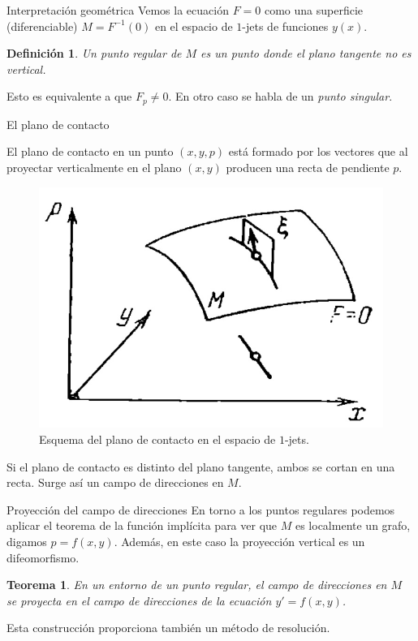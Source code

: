 \documentclass[10pt, spanish]{beamer}
\newtheorem{teorema}{Teorema}
\newtheorem{defi}{Definición}
\begin{document}
\begin{frame}{Interpretación geométrica}
  Vemos la ecuación $F=0$ como una superficie (diferenciable) $M=F^{-1}(0)$ en el espacio de $1$-jets de funciones $y(x)$.

\vspace{1em}
  \begin{defi}
    Un \textit{punto regular} de $M$ es un punto donde el plano tangente no es vertical.
  \end{defi}

  Esto es equivalente a que $F_p\neq 0$. En otro caso se habla de un \textit{punto singular}.

\end{frame}

\begin{frame}{El plano de contacto}

  El plano de contacto en un punto $(x,y,p)$ está formado por los vectores que al proyectar verticalmente en el plano $(x, y)$ producen una recta de pendiente $p$.
  \begin{figure}
	\centering
	\includegraphics[width=.45\textwidth]{../figures/jets}
	\caption{\footnotesize Esquema del plano de contacto en el espacio de $1$-jets.}
  \end{figure}
  Si el plano de contacto es distinto del plano tangente, ambos se cortan en una recta. Surge así un campo de direcciones en $M$.

\end{frame}

\begin{frame}{Proyección del campo de direcciones}
  En torno a los puntos regulares podemos aplicar el teorema de la función implícita para ver que $M$ es localmente un grafo, digamos $p=f(x,y)$. Además, en este caso la proyección vertical es un difeomorfismo.

\begin{teorema}
  En un entorno de un punto regular, el campo de direcciones en $M$ se proyecta en el campo de direcciones de la ecuación $y'=f(x,y)$.
\end{teorema}

  Esta construcción proporciona también un método de resolución.
\end{frame}
\end{document}
